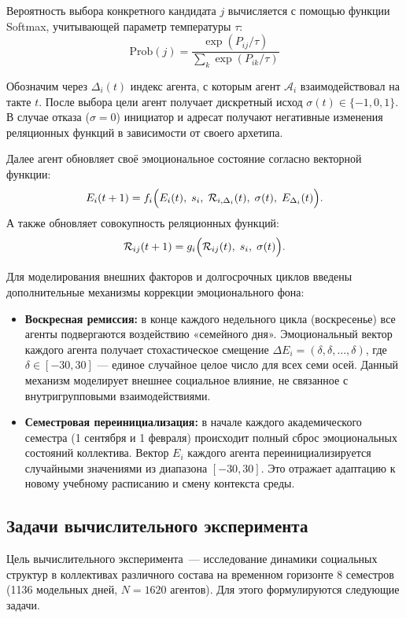 \documentclass[12pt]{article}
\begin{document}
Вероятность выбора конкретного кандидата $j$ вычисляется с помощью функции Softmax, учитывающей параметр температуры $\tau$:
\[
\text{Prob}(j) = \frac{\exp(P_{ij} / \tau)}{\sum_k \exp(P_{ik} / \tau)}
\]

Обозначим через $\Delta_i(t)$ индекс агента, с которым агент $\mathcal{A}_i$ взаимодействовал на такте $t$. После выбора цели агент получает дискретный исход $\sigma(t) \in \{-1, 0, 1\}$. В случае отказа ($\sigma = 0$) инициатор и адресат получают негативные изменения реляционных функций в зависимости от своего архетипа.

Далее агент обновляет своё эмоциональное состояние согласно векторной функции:
\[
E_i(t+1) = f_i\Bigl(E_i(t),\; s_i,\; \mathcal{R}_{i,\Delta_i}(t),\; \sigma(t),\; E_{\Delta_i}(t) \Bigr).
\]
А также обновляет совокупность реляционных функций:
\[
\mathcal{R}_{ij}(t+1) = g_i\Bigl(\mathcal{R}_{ij}(t),\; s_i,\; \sigma(t) \Bigr).
\]

Для моделирования внешних факторов и долгосрочных циклов введены дополнительные механизмы коррекции эмоционального фона:
\begin{itemize}
    \item \textbf{Воскресная ремиссия:} в конце каждого недельного цикла (воскресенье) все агенты подвергаются воздействию «семейного дня». Эмоциональный вектор каждого агента получает стохастическое смещение $\Delta E_i = (\delta, \delta, \ldots, \delta)$, где $\delta \in [-30, 30]$ — единое случайное целое число для всех семи осей. Данный механизм моделирует внешнее социальное влияние, не связанное с внутригрупповыми взаимодействиями.
    \item \textbf{Семестровая переинициализация:} в начале каждого академического семестра (1 сентября и 1 февраля) происходит полный сброс эмоциональных состояний коллектива. Вектор $E_i$ каждого агента переинициализируется случайными значениями из диапазона $[-30, 30]$. Это отражает адаптацию к новому учебному расписанию и смену контекста среды.
\end{itemize}

\subsection{Задачи вычислительного эксперимента}

Цель вычислительного эксперимента~--- исследование динамики социальных структур в коллективах различного состава на временном горизонте 8 семестров (1136 модельных дней, $N = 1620$ агентов). Для этого формулируются следующие задачи.
\end{document}
